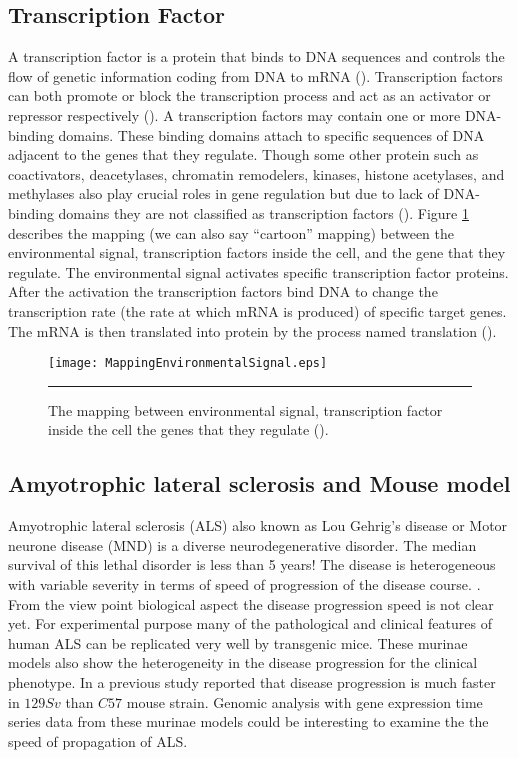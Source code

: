 \subsection{Transcription Factor}
A transcription factor is a protein that binds to DNA sequences and controls the flow of genetic information coding from DNA to mRNA (\cite{karin:1990, Latchman:1997}). Transcription factors can both promote or block the transcription process and act as an activator or repressor respectively (\cite{Lee:2000, Nikolov:1997, Roeder:1996}). A transcription factors may contain one or more DNA-binding domains. These binding domains attach to specific sequences of DNA adjacent to the genes that they regulate. Though some other protein such as coactivators, deacetylases, chromatin remodelers, kinases, histone acetylases, and methylases also play crucial roles in gene regulation but due to lack of DNA-binding domains they are not classified as transcription factors (\cite{Mitchell:1989, Ptashne:1997, Brivanlou:2002}). Figure \ref{fig:MappingEnvironmentalSignal} describes the mapping (we can also say ``cartoon'' mapping) between the environmental signal, transcription factors inside the cell, and the gene that they regulate. The environmental signal activates specific transcription factor proteins. After the activation the transcription factors bind DNA to change the transcription rate (the rate at which mRNA is produced) of 
specific target genes. The mRNA is then translated into protein by the process named translation (\cite{Alon:2006}). 

\begin{figure}%
	\centering
		\texttt{[image: MappingEnvironmentalSignal.eps]}
		\rule{35em}{0.5pt}
	\caption[The mapping between environmental signal, transcription factor 
	inside the cell the genes that they regulate]{The mapping between environmental signal, transcription factor 
	inside the cell the genes that they regulate (\cite{Alon:2006}).}
	\label{fig:MappingEnvironmentalSignal}
\end{figure}

\subsection{Amyotrophic lateral sclerosis and Mouse model}
Amyotrophic lateral sclerosis (ALS) also known as Lou Gehrig's disease or Motor neurone disease (MND) is a diverse neurodegenerative disorder. The median survival of this lethal disorder is less than 5 years! The disease is heterogeneous with variable severity in terms of speed of progression of the disease course. \cite{Brockington:2013, Peviani:2010}. From the view point biological aspect the disease progression speed is not clear yet. For experimental purpose many of the pathological and clinical features of human ALS can be replicated very well by transgenic mice. These murinae models also show the heterogeneity in the disease progression for the clinical phenotype. In a previous study \cite{Pizzasegola:2009} reported that disease progression is much faster in $129Sv$ than $C57$ mouse strain. Genomic analysis with gene expression time series data from these murinae models could be interesting to examine the the speed of propagation of ALS.

